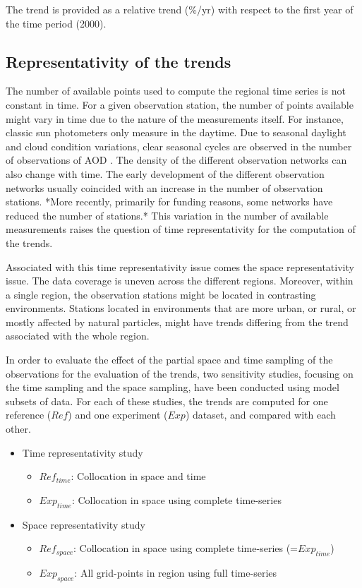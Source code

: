 \documentclass[journal abbreviation, manuscript]{copernicus}
\begin{document}
The trend is provided as a relative trend (\%/yr) with respect to the first year of the time period (2000).

\subsection{Representativity of the trends}
The number of available points used to compute the regional time series is not constant in time. For a given observation station, the number of points available might vary in time due to the nature of the measurements itself. For instance, classic sun photometers only measure in the daytime. Due to seasonal daylight and cloud condition variations, clear seasonal cycles are observed in the number of observations of AOD . The density of the different observation networks can also change with time. The early development of the different observation networks usually coincided with an increase in the number of observation stations. *More recently, primarily for funding reasons, some networks have reduced the number of stations.* This variation in the number of available measurements raises the question of time representativity for the computation of the trends.

Associated with this time representativity issue comes the space representativity issue. The data coverage is uneven across the different regions. Moreover, within a single region, the observation stations might be located in contrasting environments. Stations located in environments that are more urban, or rural, or mostly affected by natural particles, might have trends differing from the trend associated with the whole region.

In order to evaluate the effect of the partial space and time sampling of the observations for the evaluation of the trends, two sensitivity studies, focusing on the time sampling and the space sampling, have been conducted using model subsets of data. For each of these studies, the trends are computed for one reference ($Ref$) and one experiment ($Exp$) dataset, and compared with each other.
\begin{itemize}
 \item Time representativity study
       \begin{itemize}
        \item $Ref_{time}$: Collocation in space and time
        \item $Exp_{time}$: Collocation in space using complete time-series
       \end{itemize}
 \item Space representativity study
       \begin{itemize}
        \item $Ref_{space}$: Collocation in space using complete time-series (=$Exp_{time}$)
        \item $Exp_{space}$: All grid-points in region using full time-series
       \end{itemize}
\end{itemize}
\end{document}

